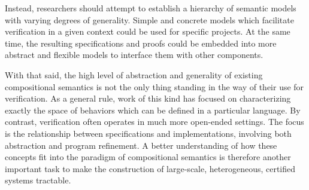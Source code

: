 \documentclass[acmsmall,screen,review,anonymous]{acmart}
\begin{document}
Instead,
researchers should attempt to establish
a hierarchy of semantic models
with varying degrees of generality.
Simple and concrete models which facilitate verification in a given context
could be used for specific projects.
At the same time,
the resulting specifications and proofs
could be embedded into more abstract and flexible models
to interface them
with other components.

With that said,
the high level of abstraction and generality of
existing compositional semantics
is not the only thing
standing in the way of their use for verification.
As a general rule,
work of this kind has focused on characterizing exactly
the space of behaviors which can be defined in a particular language.
By contrast,
verification often operates in much more open-ended settings.
The focus is the relationship between specifications and implementations,
involving both abstraction and program refinement.
A better understanding of how these concepts fit into
the paradigm of compositional semantics
is therefore another important task
to make the construction of
large-scale, heterogeneous, certified systems
tractable.



\end{document}
